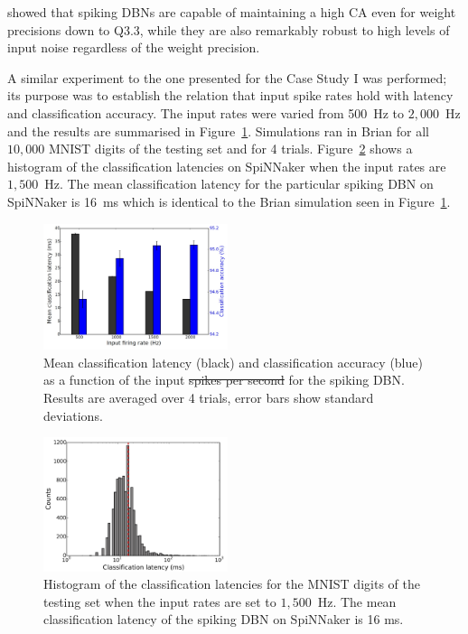 \documentclass{frontiersENG} %
\providecommand{\DIFadd}[1]{{\protect\color{blue}\uwave{#1}}} %
\providecommand{\DIFdel}[1]{{\protect\color{red}\sout{#1}}}                      %
\providecommand{\DIFaddFL}[1]{\DIFadd{#1}} %
\providecommand{\DIFdelFL}[1]{\DIFdel{#1}} %
\providecommand{\DIFaddbeginFL}{} %
\providecommand{\DIFaddendFL}{} %
\providecommand{\DIFdelbeginFL}{} %
\providecommand{\DIFdelendFL}{} %
\begin{document}
\citet{stromatias2015robustness} showed that spiking DBNs are capable of maintaining a high CA even for weight precisions down to Q3.3, while they are also remarkably robust to high levels of input noise regardless of the weight precision. 

A similar experiment to the one presented for the Case Study I was performed; its purpose was to establish the relation that input spike rates hold with latency and classification accuracy.
The input rates were varied from 500~Hz to $2,000$~Hz and the results are summarised in Figure~\ref{Fig:brianLatency}. Simulations ran in Brian for all $10,000$ MNIST digits of the testing set and for 4 trials. Figure~\ref{Fig:spinnLatency1500hz} shows a histogram of the classification latencies on SpiNNaker when the input rates are $1,500$~Hz. The mean classification latency for the particular spiking DBN on SpiNNaker is 16~ms which is identical to the Brian simulation seen in Figure~\ref{Fig:brianLatency}.


\begin{figure}[hbt!]
	\centering
	\includegraphics[width=0.48\textwidth]{fig10}
	\DIFaddendFL \caption{Mean classification latency (black) and classification accuracy (blue) as a function of the input \DIFdelbeginFL \DIFdelFL{spikes per second }\DIFdelendFL \DIFaddbeginFL \DIFaddFL{firing rate }\DIFaddendFL for the spiking DBN. Results are averaged over 4 trials, error bars show standard deviations.}
	\label{Fig:brianLatency}
\end{figure} 



\begin{figure}[hbt!]
	\centering
	\includegraphics[width=0.48\textwidth]{fig11}
	\caption{Histogram of the classification latencies for the MNIST digits of the testing set when the input rates are set to $1,500$~Hz. The mean classification latency of the spiking DBN on SpiNNaker is 16 ms.}
	\label{Fig:spinnLatency1500hz}
\end{figure} 
\end{document}
